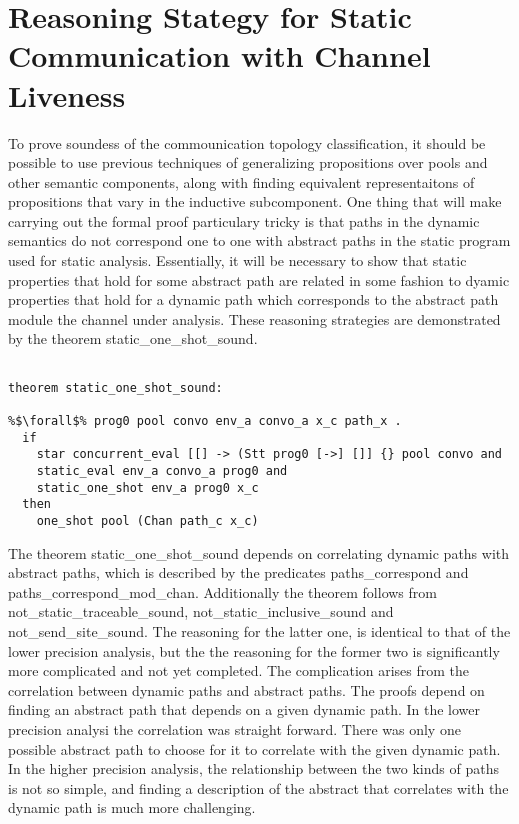 \documentclass{article}
\begin{document}
\section{Reasoning Stategy for Static Communication with Channel Liveness}
To prove soundess of the commounication topology classification, it should be possible to use
previous techniques of generalizing propositions over pools and other semantic components,
along with finding equivalent representaitons of propositions that vary in the inductive
subcomponent. One thing that will make carrying out the formal proof particulary tricky is
that paths in the dynamic semantics do not correspond one to one with abstract paths in the
static program used for static analysis.  Essentially, it will be necessary to show that static
properties that hold for some abstract path are related in some fashion to dyamic properties
that hold for a dynamic path which corresponds to the abstract path module the channel under
analysis.  These reasoning strategies are demonstrated by the theorem static\_one\_shot\_sound. 


\begin{lstlisting}[language=logic, style=codestyle1, escapechar=\%]

theorem static_one_shot_sound:

%$\forall$% prog0 pool convo env_a convo_a x_c path_x . 
  if
    star concurrent_eval [[] -> (Stt prog0 [->] []] {} pool convo and
    static_eval env_a convo_a prog0 and
    static_one_shot env_a prog0 x_c
  then 
    one_shot pool (Chan path_c x_c)

  \end{lstlisting}

The theorem static\_one\_shot\_sound depends on correlating dynamic paths with abstract paths,
which is described by the predicates paths\_correspond and paths\_correspond\_mod\_chan.
Additionally the theorem follows from not\_static\_traceable\_sound,
not\_static\_inclusive\_sound and not\_send\_site\_sound.  The reasoning for the latter one, is
identical to that of the lower precision analysis, but the the reasoning for the former two is
significantly more complicated and not yet completed.  The complication arises from the
correlation between dynamic paths and abstract paths.  The proofs depend on finding an abstract
path that depends on a given dynamic path.  In the lower precision analysi the
correlation was straight forward.  There was only one possible abstract path to choose for it
to correlate with the given dynamic path.  In the higher precision analysis, the relationship
between the two kinds of paths is not so simple, and finding a description of the abstract
that correlates with the dynamic path is much more challenging.  
\end{document}
